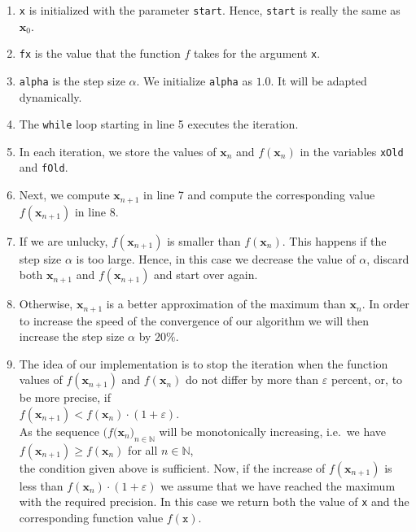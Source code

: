 \begin{enumerate}
\item \texttt{x} is initialized with the parameter \texttt{start}.  Hence, \texttt{start} is really the same as
      $\mathbf{x}_0$. 
\item \texttt{fx} is the value that the function $f$ takes for the argument \texttt{x}.
\item \texttt{alpha} is the step size $\alpha$.  We initialize \texttt{alpha} as $1.0$.  It will be adapted
      dynamically. 
\item The \texttt{while} loop starting in line 5 executes the iteration.
\item In each iteration, we store the values of $\mathbf{x}_n$ and $f(\mathbf{x}_n)$ in the variables
      \texttt{xOld} and \texttt{fOld}.
\item Next, we compute $\mathbf{x}_{n+1}$ in line 7 and compute the corresponding value $f(\mathbf{x}_{n+1})$ in line 8.
\item If we are unlucky, $f(\mathbf{x}_{n+1})$ is smaller than $f(\mathbf{x}_{n})$.  This happens if the step
      size $\alpha$ is too large.  Hence, in this case we decrease the value of $\alpha$, discard 
      both $\mathbf{x}_{n+1}$ and $f(\mathbf{x}_{n+1})$ and start over again.
\item Otherwise, $\mathbf{x}_{n+1}$ is a better approximation of the maximum than $\mathbf{x}_n$.  
      In order to increase the speed of the convergence of our algorithm we will then increase the step size
      $\alpha$ by $20\%$.    
\item The idea of our implementation is to stop the iteration when the function values of 
      $f(\mathbf{x}_{n+1})$ and $f(\mathbf{x}_{n})$ do not differ by more than $\varepsilon$ percent, or, to be more
      precise, if
      \\[0.2cm]
      \hspace*{1.3cm}
      $f(\mathbf{x}_{n+1}) < f(\mathbf{x}_{n}) \cdot (1 + \varepsilon)$.
      \\[0.2cm]
      As the sequence $\bigl(f(\mathbf{x}_n\bigr)_{n\in\mathbb{N}}$ will be monotonically
      increasing, i.e.~we have
      \\[0.2cm]
      \hspace*{1.3cm}
      $f(\mathbf{x}_{n+1}) \geq f(\mathbf{x}_{n})$ \quad for all $n\in\mathbb{N}$,
      \\[0.2cm]
      the condition given above is sufficient.  Now, if the increase of  $f(\mathbf{x}_{n+1})$ is less than $f(\mathbf{x}_{n}) \cdot (1 + \varepsilon)$ 
      we assume that we have reached the maximum with the required precision.  In this case we return both the
      value of \texttt{x} and the corresponding function value $f(\mathtt{x})$.
\end{enumerate}

